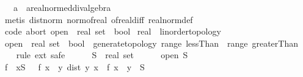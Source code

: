 \begin{isabellebody}
\ \ \ a\ {\isacharcolon}{\kern0pt}{\isacharcolon}{\kern0pt}\ {\isachardoublequoteopen}{\isacharprime}{\kern0pt}a{\isacharcolon}{\kern0pt}{\isacharcolon}{\kern0pt}real{\isacharunderscore}{\kern0pt}normed{\isacharunderscore}{\kern0pt}div{\isacharunderscore}{\kern0pt}algebra{\isachardoublequoteclose}\isanewline
%
\isadelimproof
\ \ %
\endisadelimproof
%
\isatagproof
{}\isamarkupfalse%
\ {\isacharparenleft}{\kern0pt}metis\ dist{\isacharunderscore}{\kern0pt}norm\ norm{\isacharunderscore}{\kern0pt}of{\isacharunderscore}{\kern0pt}real\ of{\isacharunderscore}{\kern0pt}real{\isacharunderscore}{\kern0pt}diff\ real{\isacharunderscore}{\kern0pt}norm{\isacharunderscore}{\kern0pt}def{\isacharparenright}{\kern0pt}%
\endisatagproof
{\isafoldproof}%
%
\isadelimproof
\isanewline
%
\endisadelimproof
\isanewline
{}\isamarkupfalse%
\ {\isacharbrackleft}{\kern0pt}{\isacharbrackleft}{\kern0pt}code\ abort{\isacharcolon}{\kern0pt}\ {\isachardoublequoteopen}open\ {\isacharcolon}{\kern0pt}{\isacharcolon}{\kern0pt}\ real\ set\ {\isasymRightarrow}\ bool{\isachardoublequoteclose}{\isacharbrackright}{\kern0pt}{\isacharbrackright}{\kern0pt}\isanewline
\isanewline
{}\isamarkupfalse%
\ real\ {\isacharcolon}{\kern0pt}{\isacharcolon}{\kern0pt}\ linorder{\isacharunderscore}{\kern0pt}topology\isanewline
%
\isadelimproof
%
\endisadelimproof
%
\isatagproof
{}\isamarkupfalse%
\isanewline
\ \ \isamarkupfalse%
\ {\isachardoublequoteopen}{\isacharparenleft}{\kern0pt}open\ {\isacharcolon}{\kern0pt}{\isacharcolon}{\kern0pt}\ real\ set\ {\isasymRightarrow}\ bool{\isacharparenright}{\kern0pt}\ {\isacharequal}{\kern0pt}\ generate{\isacharunderscore}{\kern0pt}topology\ {\isacharparenleft}{\kern0pt}range\ lessThan\ {\isasymunion}\ range\ greaterThan{\isacharparenright}{\kern0pt}{\isachardoublequoteclose}\isanewline
\ \ \isamarkupfalse%
\ {\isacharparenleft}{\kern0pt}rule\ ext{\isacharcomma}{\kern0pt}\ safe{\isacharparenright}{\kern0pt}\isanewline
\ \ \ \ \isamarkupfalse%
\ S\ {\isacharcolon}{\kern0pt}{\isacharcolon}{\kern0pt}\ {\isachardoublequoteopen}real\ set{\isachardoublequoteclose}\isanewline
\ \ \ \ \isamarkupfalse%
\ {\isachardoublequoteopen}open\ S{\isachardoublequoteclose}\isanewline
\ \ \ \ \isamarkupfalse%
\ \isamarkupfalse%
\ f\ \ {\isachardoublequoteopen}{\isasymforall}x{\isasymin}S{\isachardot}{\kern0pt}\ {}\ {\isacharless}{\kern0pt}\ f\ x\ {\isasymand}\ {\isacharparenleft}{\kern0pt}{\isasymforall}y{\isachardot}{\kern0pt}\ dist\ y\ x\ {\isacharless}{\kern0pt}\ f\ x\ {\isasymlongrightarrow}\ y\ {\isasymin}\ S{\isacharparenright}{\kern0pt}{\isachardoublequoteclose}\isanewline

\end{isabellebody}
